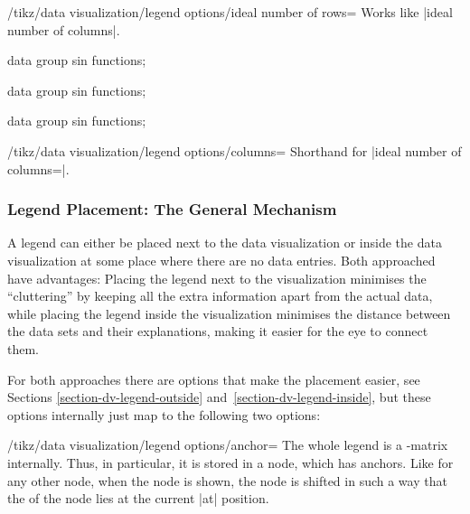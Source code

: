 \begin{key}{/tikz/data visualization/legend options/ideal number of rows=}
    Works like |ideal number of columns|.
\begin{codeexample}[width=7cm]
\tikz \datavisualization [
  visualize as smooth line/.list={1,2,3,4,5,6,7,8},
  legend example, style sheet=vary hue,
  main legend={ideal number of rows=2}]
data group {sin functions};
\end{codeexample}
\begin{codeexample}[width=7cm]
\tikz \datavisualization [
  visualize as smooth line/.list={1,2,3,4,5,6,7,8},
  legend example, style sheet=vary hue,
  main legend={ideal number of rows=4}]
data group {sin functions};
\end{codeexample}
\begin{codeexample}[width=7cm]
\tikz \datavisualization [
  visualize as smooth line/.list={1,2,3,4,5,6,7,8},
  legend example, style sheet=vary hue,
  main legend={max columns=3,ideal number of rows=2}]
data group {sin functions};
\end{codeexample}
\end{key}

\begin{key}{/tikz/data visualization/legend options/columns=}
    Shorthand for |ideal number of columns=|.
\end{key}


\subsubsection{Legend Placement: The General Mechanism}

A legend can either be placed next to the data visualization or inside the data
visualization at some place where there are no data entries. Both approached
have advantages: Placing the legend next to the visualization minimises the
``cluttering'' by keeping all the extra information apart from the actual data,
while placing the legend inside the visualization minimises the distance
between the data sets and their explanations, making it easier for the eye to
connect them.

For both approaches there are options that make the placement easier, see
Sections \ref{section-dv-legend-outside} and~\ref{section-dv-legend-inside},
but these options internally just map to the following two options:

\begin{key}{/tikz/data visualization/legend options/anchor=}
    The whole legend is a \tikzname-matrix internally. Thus, in particular, it
    is stored in a node, which has anchors. Like for any other node, when the
    node is shown, the node is shifted in such a way that the  of
    the node lies at the current |at| position.
\end{key}

